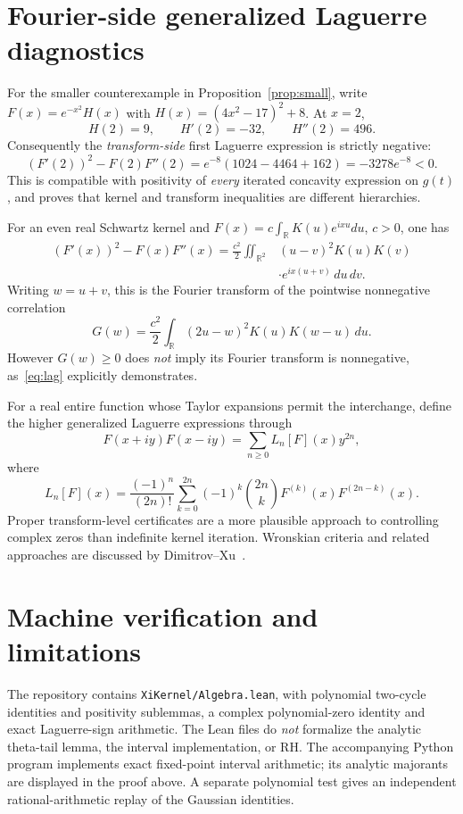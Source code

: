 \section{Fourier-side generalized Laguerre diagnostics}
For the smaller counterexample in Proposition~\ref{prop:small},
write $F(x)=e^{-x^2}H(x)$ with
$H(x)=(4x^2-17)^2+8$. At $x=2$,
\[
H(2)=9,\qquad H'(2)=-32,\qquad H''(2)=496.
\]
Consequently the \emph{transform-side} first Laguerre expression
is strictly negative:
\begin{equation}\label{eq:lag}
(F'(2))^2-F(2)F''(2)
=e^{-8}(1024-4464+162)
=-3278e^{-8}<0.
\end{equation}
This is compatible with positivity of \emph{every} iterated
concavity expression on $g(t)$, and proves that kernel and
transform inequalities are different hierarchies.

For an even real Schwartz kernel and
$F(x)=c\int_{\mathbb R}K(u)e^{ixu}du$, $c>0$, one has
\begin{align}\label{eq:correlation}
(F'(x))^2-F(x)F''(x)
=\frac{c^2}{2}\iint_{\mathbb R^2}
&(u-v)^2K(u)K(v)\\[-0.8em]
&\cdot e^{ix(u+v)}\,du\,dv.\nonumber
\end{align}
Writing $w=u+v$, this is the Fourier transform of the
pointwise nonnegative correlation
\[
G(w)=\frac{c^2}{2}\int_{\mathbb R}
(2u-w)^2K(u)K(w-u)\,du.
\]
However $G(w)\ge0$ does \emph{not} imply its Fourier transform
is nonnegative, as~\eqref{eq:lag} explicitly demonstrates.

For a real entire function whose Taylor expansions permit the
interchange, define the higher generalized Laguerre expressions
through
\[
F(x+iy)F(x-iy)=\sum_{n\ge0}L_n[F](x)y^{2n},
\]
where
\[
L_n[F](x)=\frac{(-1)^n}{(2n)!}
\sum_{k=0}^{2n}(-1)^k{2n\choose k}
F^{(k)}(x)F^{(2n-k)}(x).
\]
Proper transform-level certificates are a more plausible approach
to controlling complex zeros than indefinite kernel iteration.
Wronskian criteria and related approaches are discussed by
Dimitrov--Xu~\cite{DX}.

\section{Machine verification and limitations}
The repository contains \texttt{XiKernel/Algebra.lean}, with
polynomial two-cycle identities and positivity sublemmas,
a complex polynomial-zero identity and exact Laguerre-sign
arithmetic. The Lean files do \emph{not} formalize the analytic
theta-tail lemma, the interval implementation, or RH.
The accompanying Python program implements exact fixed-point
interval arithmetic; its analytic majorants are displayed in
the proof above. A separate polynomial test gives an
independent rational-arithmetic replay of the Gaussian identities.

